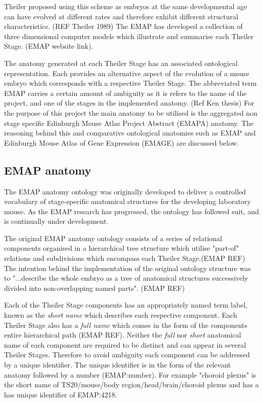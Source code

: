 Theiler proposed using this scheme as embryos at the same developmental age can have evolved at different rates and therefore exhibit different structural characteristics. (REF Theiler 1989) The EMAP has developed a collection of three dimensional computer models which illustrate and summarise each Theiler Stage. (EMAP website link). 

The anatomy generated at each Theiler Stage has an associated ontological representation. Each provides an alternative aspect of the evolution of a mouse embryo which corresponds with a respective Theiler Stage. The abbreviated term EMAP carries a certain amount of ambiguity as it is refers to the name of the project, and one of the stages in the implemented anatomy. (Ref Ken thesis)  For the purpose of this project the main anatomy to be utilised is the aggregated non stage specific Edinburgh Mouse Atlas Project Abstract (EMAPA) anatomy. The reasoning behind this and comparative ontological anatomies such as EMAP and Edinburgh Mouse Atlas of Gene Expression (EMAGE) are discussed below.

\subsection{EMAP anatomy}
The EMAP anatomy ontology was originally developed to deliver a controlled vocabulary of stage-specific anatomical structures for the developing laboratory mouse. As the EMAP research has progressed, the ontology has followed suit, and is continually under development.

The original EMAP anatomy ontology consists of a series of relational components organised in a hierarchical tree structure which utilise "part-of" relations and subdivisions which encompass each Theiler Stage.(EMAP REF)  The intention behind the implementation of the original ontology structure was to "...describe the whole embryo as a tree of anatomical structures successively divided into non-overlapping named parts". (EMAP REF)

Each of the Theiler Stage components has an appropriately named term label, known as the \textit{short name} which describes each respective component. Each Theiler Stage also has a \textit{full name} which comes in the form of the components entire hierarchical path (EMAP REF). Neither the \textit{full} nor \textit{short} anatomical name of each component are required to be distinct and can appear in several Theiler Stages. Therefore to avoid ambiguity each component can be addressed by a unique identifier. The unique identifier is in the form of the relevant anatomy followed by a number (EMAP:number). For example "choroid plexus" is the short name of TS20/mouse/body region/head/brain/choroid plexus and has a has unique identifier of EMAP:4218.

